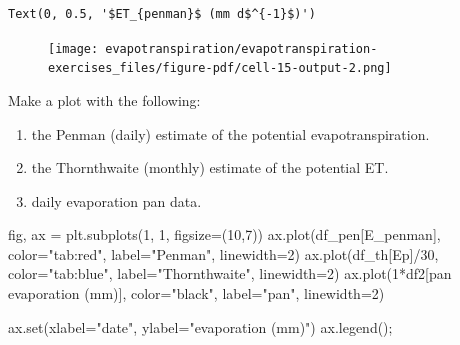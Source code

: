 \documentclass[
  letterpaper,
  DIV=11,
  numbers=noendperiod]{scrreprt}
\newenvironment{Shaded}{\begin{snugshade}}{\end{snugshade}}
\newcommand{\BuiltInTok}[1]{\textcolor[rgb]{0.00,0.23,0.31}{#1}}
\newcommand{\DecValTok}[1]{\textcolor[rgb]{0.68,0.00,0.00}{#1}}
\newcommand{\NormalTok}[1]{\textcolor[rgb]{0.00,0.23,0.31}{#1}}
\newcommand{\OperatorTok}[1]{\textcolor[rgb]{0.37,0.37,0.37}{#1}}
\newcommand{\StringTok}[1]{\textcolor[rgb]{0.13,0.47,0.30}{#1}}
\providecommand{\tightlist}{%
  \setlength{\itemsep}{0pt}\setlength{\parskip}{0pt}}\usepackage{longtable,booktabs,array}
\begin{document}
\begin{verbatim}
Text(0, 0.5, '$ET_{penman}$ (mm d$^{-1}$)')
\end{verbatim}

\begin{figure}[H]

{\centering \texttt{[image: evapotranspiration/evapotranspiration-exercises\_files/figure-pdf/cell-15-output-2.png]}

}

\end{figure}

Make a plot with the following:

\begin{enumerate}
\def\labelenumi{\arabic{enumi}.}
\tightlist
\item
  the Penman (daily) estimate of the potential evapotranspiration.
\item
  the Thornthwaite (monthly) estimate of the potential ET.
\item
  daily evaporation pan data.
\end{enumerate}

\begin{Shaded}
\begin{Highlighting}[]
\NormalTok{fig, ax }\OperatorTok{=}\NormalTok{ plt.subplots(}\DecValTok{1}\NormalTok{, }\DecValTok{1}\NormalTok{, figsize}\OperatorTok{=}\NormalTok{(}\DecValTok{10}\NormalTok{,}\DecValTok{7}\NormalTok{))}
\NormalTok{ax.plot(df\_pen[}\StringTok{\textquotesingle{}E\_penman\textquotesingle{}}\NormalTok{], color}\OperatorTok{=}\StringTok{"tab:red"}\NormalTok{, label}\OperatorTok{=}\StringTok{"Penman"}\NormalTok{, linewidth}\OperatorTok{=}\DecValTok{2}\NormalTok{)}
\NormalTok{ax.plot(df\_th[}\StringTok{\textquotesingle{}Ep\textquotesingle{}}\NormalTok{]}\OperatorTok{/}\DecValTok{30}\NormalTok{, color}\OperatorTok{=}\StringTok{"tab:blue"}\NormalTok{, label}\OperatorTok{=}\StringTok{"Thornthwaite"}\NormalTok{, linewidth}\OperatorTok{=}\DecValTok{2}\NormalTok{)}
\NormalTok{ax.plot(}\DecValTok{1}\OperatorTok{*}\NormalTok{df2[}\StringTok{\textquotesingle{}pan evaporation (mm)\textquotesingle{}}\NormalTok{], color}\OperatorTok{=}\StringTok{"black"}\NormalTok{, label}\OperatorTok{=}\StringTok{"pan"}\NormalTok{, linewidth}\OperatorTok{=}\DecValTok{2}\NormalTok{)}

\NormalTok{ax.}\BuiltInTok{set}\NormalTok{(xlabel}\OperatorTok{=}\StringTok{"date"}\NormalTok{,}
\NormalTok{       ylabel}\OperatorTok{=}\StringTok{"evaporation (mm)"}\NormalTok{)}
\NormalTok{ax.legend()}\OperatorTok{;}
\end{Highlighting}
\end{Shaded}
\end{document}
